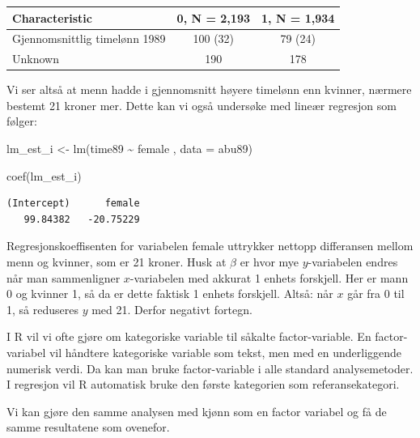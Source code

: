 \documentclass[
  letterpaper,
  DIV=11,
  numbers=noendperiod]{scrreprt}
\newenvironment{Shaded}{\begin{snugshade}}{\end{snugshade}}
\newcommand{\AttributeTok}[1]{\textcolor[rgb]{0.40,0.45,0.13}{#1}}
\newcommand{\FunctionTok}[1]{\textcolor[rgb]{0.28,0.35,0.67}{#1}}
\newcommand{\NormalTok}[1]{\textcolor[rgb]{0.00,0.23,0.31}{#1}}
\newcommand{\OtherTok}[1]{\textcolor[rgb]{0.00,0.23,0.31}{#1}}
\newcommand{\SpecialCharTok}[1]{\textcolor[rgb]{0.37,0.37,0.37}{#1}}
\theoremstyle{definition}
\theoremstyle{remark}
\begin{document}
\begin{longtable}[]{@{}lcc@{}}
\toprule()
\textbf{Characteristic} & \textbf{0}, N = 2,193 & \textbf{1}, N =
1,934 \\
\midrule()
\endhead
Gjennomsnittlig timelønn 1989 & 100 (32) & 79 (24) \\
Unknown & 190 & 178 \\
\bottomrule()
\end{longtable}

Vi ser altså at menn hadde i gjennomsnitt høyere timelønn enn kvinner,
nærmere bestemt 21 kroner mer. Dette kan vi også undersøke med lineær
regresjon som følger:

\begin{Shaded}
\begin{Highlighting}[]
\NormalTok{lm\_est\_i }\OtherTok{\textless{}{-}} \FunctionTok{lm}\NormalTok{(time89 }\SpecialCharTok{\textasciitilde{}}\NormalTok{ female , }\AttributeTok{data =}\NormalTok{ abu89)}

\FunctionTok{coef}\NormalTok{(lm\_est\_i)}
\end{Highlighting}
\end{Shaded}

\begin{verbatim}
(Intercept)      female 
   99.84382   -20.75229 
\end{verbatim}

Regresjonskoeffisenten for variabelen female uttrykker nettopp
differansen mellom menn og kvinner, som er 21 kroner. Husk at \(\beta\)
er hvor mye \(y\)-variabelen endres når man sammenligner
\(x\)-variabelen med akkurat 1 enhets forskjell. Her er mann 0 og
kvinner 1, så da er dette faktisk 1 enhets forskjell. Altså: når \(x\)
går fra 0 til 1, så reduseres \(y\) med 21. Derfor negativt fortegn.

I R vil vi ofte gjøre om kategoriske variable til såkalte
factor-variable. En factor-variabel vil håndtere kategoriske variable
som tekst, men med en underliggende numerisk verdi. Da kan man bruke
factor-variable i alle standard analysemetoder. I regresjon vil R
automatisk bruke den første kategorien som referansekategori.

Vi kan gjøre den samme analysen med kjønn som en factor variabel og få
de samme resultatene som ovenefor.
\end{document}
